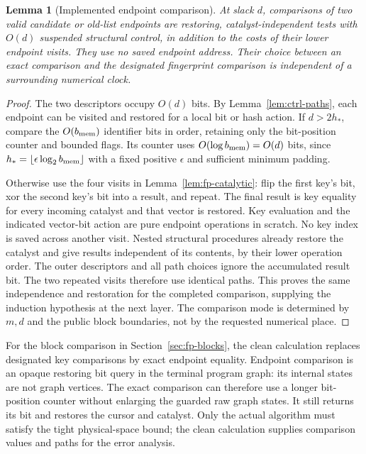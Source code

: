 \documentclass[11pt]{article}
\numberwithin{equation}{section}
\newtheorem{lemma}[theorem]{Lemma}
\theoremstyle{definition}
\theoremstyle{remark}
\begin{document}
\begin{lemma}[Implemented endpoint comparison]\label{lem:ctrl-equality}
At slack $d$, comparisons of two valid candidate or old-list endpoints
are restoring, catalyst-independent tests with $O(d)$ suspended
structural control, in addition to the costs of their lower endpoint
visits.  They use no saved endpoint address.  Their choice between an
exact comparison and the designated fingerprint comparison is
independent of a surrounding numerical clock.
\end{lemma}

\begin{proof}
The two descriptors occupy $O(d)$ bits.  By
Lemma~\ref{lem:ctrl-paths}, each endpoint can be visited and restored for
a local bit or hash action.  If $d>2h_*$, compare the $O({b_{\rm mem}})$ identifier
bits in order, retaining only the bit-position counter and bounded
flags.  Its counter uses $O(\log {b_{\rm mem}})=O(d)$ bits, since
$h_*=\lfloor\epsilon\log_2 {b_{\rm mem}}\rfloor$ with a fixed positive
$\epsilon$ and sufficient minimum padding.

Otherwise use the four visits in Lemma~\ref{lem:fp-catalytic}: flip the
first key's bit, xor the second key's bit into a result, and repeat.
The final result is key equality for every incoming catalyst and that
vector is restored.  Key evaluation and the indicated vector-bit
action are pure endpoint operations in scratch.  No key index is saved
across another visit.  Nested structural procedures already restore the
catalyst and give results independent of its contents, by their lower
operation order.  The outer descriptors and all path choices ignore
the accumulated result bit.  The two repeated visits therefore use
identical paths.  This proves the same independence and restoration
for the completed comparison, supplying the induction hypothesis at
the next layer.  The comparison mode is determined by ${m},d$ and the
public block boundaries, not by the requested numerical place.
\end{proof}

For the block comparison in Section~\ref{sec:fp-blocks}, the clean
calculation replaces designated key comparisons by exact endpoint
equality.  Endpoint comparison is an opaque restoring bit query in the
terminal program graph: its internal states are not graph vertices.
The exact comparison can therefore use a longer bit-position counter
without enlarging the guarded raw graph states.  It still returns its
bit and restores the cursor and catalyst.  Only the actual algorithm
must satisfy the tight physical-space bound; the clean calculation
supplies comparison values and paths for the error analysis.
\end{document}
